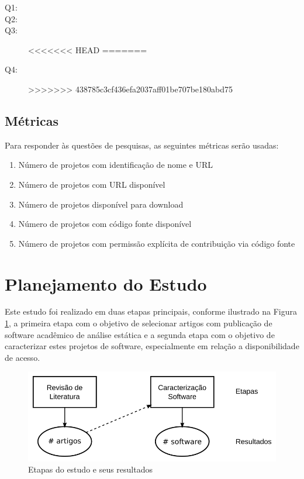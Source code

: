 \begin{description}
  \item [Q1:] \EstudoUmQuestaoUm
  \item [Q2:] \EstudoUmQuestaoDois
  \item [Q3:] \EstudoUmQuestaoTres
<<<<<<< HEAD
=======
  \item [Q4:] \EstudoUmQuestaoQuatro
>>>>>>> 438785c3cf436efa2037aff01be707be180abd75
\end{description}

\subsection{Métricas}

Para responder às questões de pesquisas, as seguintes métricas serão usadas:

\begin{enumerate}
  \item Número de projetos com identificação de nome e URL
  \item Número de projetos com URL disponível
  \item Número de projetos disponível para download
  \item Número de projetos com código fonte disponível
  \item Número de projetos com permissão explícita de contribuição via código fonte
\end{enumerate}


\section{Planejamento do Estudo} \label{estudo1:planejamento} %

Este estudo foi realizado em duas etapas principais, conforme ilustrado na
Figura \ref{estudo1-etapas}, a primeira etapa com o objetivo de selecionar
artigos com publicação de software acadêmico de análise estática e a segunda
etapa com o objetivo de caracterizar estes projetos de software, especialmente
em relação a disponibilidade de acesso.

\begin{figure}[h]
  \center
  \includegraphics[scale=0.4]{imagens/estudo1-etapas.png}
  \caption{Etapas do estudo e seus resultados}
  \label{estudo1-etapas}
\end{figure}

